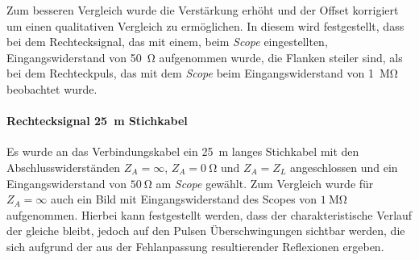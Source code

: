 \documentclass[a4paper,twoside,final]{article}
\begin{document}
Zum besseren Vergleich wurde die Verstärkung erhöht und der Offset korrigiert um einen qualitativen Vergleich zu ermöglichen. In diesem wird festgestellt, dass bei dem Rechtecksignal, das mit einem, beim \textit{Scope} eingestellten, Eingangswiderstand von \SI{50}{\ohm} aufgenommen wurde, die Flanken steiler sind, als bei dem Rechteckpuls, das mit dem \textit{Scope} beim Eingangswiderstand von \SI{1}{\mega\ohm} beobachtet wurde.

\paragraph{Rechtecksignal \SI{25}{\metre} Stichkabel}\label{par:Stichkabel}
Es wurde an das Verbindungskabel ein \SI{25}{\metre} langes Stichkabel mit den Abschlusswiderständen $Z_A = \infty $, $Z_A = \SI{0}{\ohm}$ und $Z_A = Z_L$ angeschlossen und ein Eingangswiderstand von $\SI{50}{\ohm}$ am \textit{Scope} gewählt. Zum Vergleich wurde für $Z_A = \infty$ auch ein Bild mit Eingangswiderstand des Scopes von $\SI{1}{\mega\ohm}$ aufgenommen. Hierbei kann festgestellt werden, dass der charakteristische Verlauf der gleiche bleibt, jedoch auf den Pulsen Überschwingungen sichtbar werden, die sich aufgrund der aus der Fehlanpassung resultierender Reflexionen ergeben.
\end{document}
